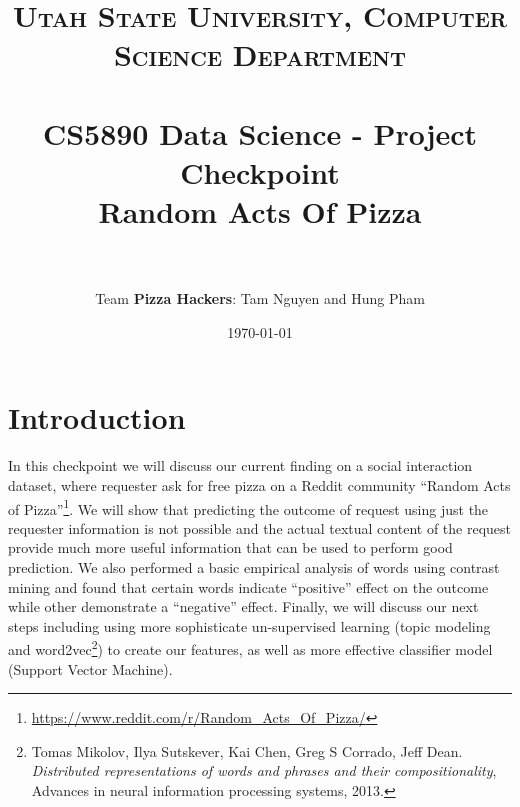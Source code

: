 \documentclass[paper=a4, fontsize=11pt]{scrartcl} %
\title{	
\normalfont \normalsize 
\textsc{Utah State University, Computer Science Department} \\ [25pt] %
\horrule{0.5pt} \\[0.4cm] %
\huge CS5890 Data Science - Project Checkpoint \\ Random Acts Of Pizza \\ %
\horrule{2pt} \\[0.5cm] %
}
\author{Team \textbf{Pizza Hackers}: Tam Nguyen and Hung Pham} %
\date{\normalsize\today} %
\newcommand{\q}[1]{``#1''}
\begin{document}
\maketitle

\section{Introduction}

In this checkpoint we will discuss our current finding on a social interaction dataset, where requester ask for free pizza on a Reddit community \q{Random Acts of Pizza}\footnote{\url{https://www.reddit.com/r/Random_Acts_Of_Pizza/}}. We will show that predicting the outcome of request using just the requester information is not possible and the actual textual content of the request provide much more useful information that can be used to perform good prediction. We also performed a basic empirical analysis of words using contrast mining and found that certain words indicate \q{positive} effect on the outcome while other demonstrate a \q{negative} effect. Finally, we will discuss our next steps including using more sophisticate un-supervised learning (topic modeling and word2vec\footnote{Tomas Mikolov, Ilya Sutskever, Kai Chen, Greg S Corrado, Jeff Dean. \emph{Distributed representations of words and phrases and their compositionality}, Advances in neural information processing systems, 2013.}) to create our features, as well as more effective classifier model (Support Vector Machine).




%


%
%


\end{document}
